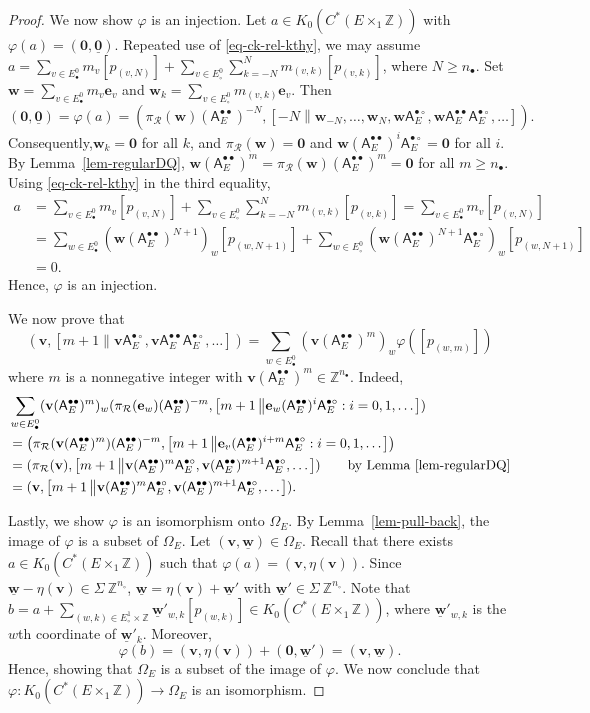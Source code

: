 \documentclass[12pt]{amsbook}%
\newcommand{\ee}{{\mathbf e}}
\renewcommand{\phi}{\varphi}
\theoremstyle{defin}
\theoremstyle{remark}
\numberwithin{equation}{chapter}
\numberwithin{theor}{section}
\newcommand{\ZZ}{\mathbb{Z}}
\newcommand{\nsX}{\Sigma\ }
\newcommand{\oXe}[2]{\left[#1\left\|{#2}\right.\right]}
\newcommand{\regX}{{\bullet}}
\newcommand{\singX}{{\circ}}
\newcommand{\ww}{\mathbf{w}}
\newcommand{\vv}{\mathbf{v}}
\newcommand{\www}{\underline{\mathbf w}}
\newcommand{\oo}{{\mathbf 0}}
\newcommand{\ooo}{\underline{\mathbf 0}}
\newcommand{\nos}{{n_\singX}}
\newcommand{\nor}{{n_\regX}}
\newcommand{\pK}[1]{\pi_{\mathcal R}(#1)}
\newcommand{\adjRR}{\mathsf{A}^{\bullet\bullet}}
\newcommand{\adjRS}{\mathsf{A}^{\bullet\circ}}
\newcommand{\nDT}{\Omega}
\begin{document}
\begin{proof}
We now show $\phi$ is an injection.  Let $a \in K_0(C^*(E \times_1\ZZ))$ with $\phi(a) = (\oo, \ooo)$.  Repeated use of \eqref{eq-ck-rel-kthy}, we may assume $a = \sum_{v \in E_\regX^0 } m_{v} [ p_{(v, N)}] +  \sum_{v \in E_\singX^0 } \sum_{k = -N}^N m_{(v,k)} [ p_{(v, k)}]$, where $N \geq \nor$.  Set $\mathbf{w} = \sum_{v \in E_{\regX}^0} m_v \mathbf{e}_v$ and $\mathbf{w}_k =  \sum_{v \in E^0_\singX} m_{(v,k)} \mathbf{e}_{v}$.  Then 
\[
(\oo, \ooo)=\phi(a) = (\pK{\ww}(\adjRR_E)^{-N} , \oXe{-N}{\ww_{-N}, \ldots, \ww_N, \ww \adjRS_E , \ww  \adjRR_E \adjRS_E, \dots}). 
\]
Consequently,$\ww_{k} = \oo$ for all $k$, and $\pK{\ww} = \oo$ and $\ww (\adjRR_E)^i \adjRS_E = \oo$ for all $i$.  By Lemma~\ref{lem-regularDQ}, $\ww (\adjRR_E)^m = \pK{\ww} (\adjRR_E)^m = \oo$ for all $m \geq \nor$.  Using \eqref{eq-ck-rel-kthy} in the third equality,
\begin{align*}
a &= \sum_{v \in E_\regX^0 } m_{v} [ p_{(v, N)}] +  \sum_{v \in E_\singX^0 } \sum_{k = -N}^N m_{(v,k)} [ p_{(v, k)}]=  \sum_{v \in E_\regX^0 } m_{v} [ p_{(v, N)}] \\
	&= \sum_{ w \in E_\regX^0 } (\ww (\adjRR_E)^{N+1})_w [ p_{(w,N+1)}] + \sum_{ w \in E_\singX^0 } (\ww (\adjRR_E)^{N+1} \adjRS_E)_w [ p_{(w,N +1)} ] \\
	&= 0.
\end{align*}
Hence, $\phi$ is an injection.

We now prove that 
\[
(\vv, \oXe{m+1}{ \vv \adjRS_E, \vv \adjRR_E \adjRS_E, \dots} ) = \sum_{w \in E^0_\regX} (\vv (\adjRR_E)^m)_w  \phi( [ p_{(w,m)} ])
\] 
where $m$ is a nonnegative integer with $\vv (\adjRR_E)^m \in \ZZ^{\nor}$.   Indeed,
\begin{align*}
&\sum_{w \in E^0_\regX}  (\vv (\adjRR_E)^m)_w ( \pK{\ee_w} (\adjRR_E)^{-m} , \oXe{m+1}{ \ee_w (\adjRR_E)^i  \adjRS_E : i =0,1,\dots}) \\
&=\left( \pK{\vv (\adjRR_E)^m} (\adjRR_E)^{-m} ,   \oXe{m+1}{ \ee_v (\adjRR_E)^{i+m}  \adjRS_E : i =0,1,\dots} \right) \\
	&= (\pK{\vv} , \oXe{m+1}{ \vv (\adjRR_E)^m \adjRS_E, \vv (\adjRR_E)^{m+1}\adjRS_E, \dots} ) \qquad \text{by Lemma~\ref{lem-regularDQ}}\\
	&= (\vv, \oXe{m+1}{ \vv (\adjRR_E)^m \adjRS_E, \vv (\adjRR_E)^{m+1}\adjRS_E, \dots}).
\end{align*}

Lastly, we show $\phi$ is an isomorphism onto $\nDT_E$.  By Lemma~\ref{lem-pull-back}, the image of $\phi$ is a subset of $\nDT_E$.  Let $(\vv, \www) \in \nDT_E$.  Recall that there exists $a \in K_0(C^*(E \times_1\ZZ))$ such that $\phi(a) = (\vv, \eta(\vv))$.  Since $\www - \eta(\vv) \in \nsX\ZZ^{\nos}$, $\www = \eta(\vv) + \www'$ with $\www' \in  \nsX\ZZ^{\nos}$.  Note that $b  = a + \sum_{(w,k) \in E^1_\singX \times \ZZ } \www'_{w,k} [ p_{(w,k)}] \in K_0(C^*(E \times_1\ZZ))$, where $\www'_{w,k}$ is the $w$th coordinate of $\www'_k$.  Moreover,
\[
\phi(b) = (\vv, \eta(\vv)) + ( \oo , \www') = (\vv, \www).
\]
Hence, showing that $\nDT_E$ is a subset of the image of $\phi$.  We now conclude that $\phi \colon K_0(C^*(E \times_1\ZZ)) \to \nDT_E$ is an isomorphism.
 \end{proof}
 
\end{document}
